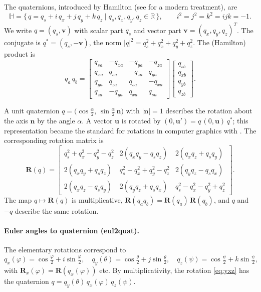 \documentclass{article}
\theoremstyle{plain}
\theoremstyle{definition}
\newcommand{\R}{\mathbb{R}}
\newcommand{\Ha}{\mathbb{H}}
\newcommand{\vect}[1]{\boldsymbol{#1}}
\begin{document}
The quaternions, introduced by Hamilton \cite{hamilton1844} (see \cite{vincequaternions} for a
modern treatment), are
\begin{equation}
  \Ha = \{\, q = q_s + i\,q_x + j\,q_y + k\,q_z \mid q_s, q_x, q_y, q_z \in \R \,\},\qquad
  i^2 = j^2 = k^2 = ijk = -1 .
\end{equation}
We write $q = (q_s, \vect v)$ with scalar part $q_s$ and vector part
$\vect v = (q_x, q_y, q_z)^T$. The conjugate is $q^* = (q_s, -\vect v)$, the norm
$|q|^2 = q_s^2 + q_x^2 + q_y^2 + q_z^2$. The (Hamilton) product is
\begin{equation}
  q_a\, q_b =
  \begin{bmatrix}
    q_{sa} & -q_{xa} & -q_{ya} & -q_{za} \\
    q_{xa} &  q_{sa} & -q_{za} &  q_{ya} \\
    q_{ya} &  q_{za} &  q_{sa} & -q_{xa} \\
    q_{za} & -q_{ya} &  q_{xa} &  q_{sa}
  \end{bmatrix}
  \begin{bmatrix} q_{sb} \\ q_{xb} \\ q_{yb} \\ q_{zb} \end{bmatrix}.
\end{equation}

A unit quaternion $q = \bigl(\cos\tfrac{\alpha}{2},\, \sin\tfrac{\alpha}{2}\,\vect n\bigr)$ with
$|\vect n| = 1$ describes the rotation about the axis $\vect n$ by the angle $\alpha$. A vector
$\vect u$ is rotated by $(0, \vect u') = q\,(0, \vect u)\,q^*$; this representation became the
standard for rotations in computer graphics with \cite{shoemake1985}. The corresponding rotation
matrix is
\begin{equation}\label{eq:Rq}
  \vect R(q) =
  \begin{bmatrix}
    q_s^2 + q_x^2 - q_y^2 - q_z^2 & 2(q_x q_y - q_s q_z) & 2(q_x q_z + q_s q_y) \\
    2(q_x q_y + q_s q_z) & q_s^2 - q_x^2 + q_y^2 - q_z^2 & 2(q_y q_z - q_s q_x) \\
    2(q_x q_z - q_s q_y) & 2(q_y q_z + q_s q_x) & q_s^2 - q_x^2 - q_y^2 + q_z^2
  \end{bmatrix}.
\end{equation}
The map $q \mapsto \vect R(q)$ is multiplicative, $\vect R(q_a q_b) = \vect R(q_a)\,\vect R(q_b)$,
and $q$ and $-q$ describe the same rotation.

\paragraph{Euler angles to quaternion (eul2quat).}
The elementary rotations correspond to
\begin{equation}
  q_x(\varphi) = \cos\tfrac{\varphi}{2} + i \sin\tfrac{\varphi}{2},\quad
  q_y(\theta) = \cos\tfrac{\theta}{2} + j \sin\tfrac{\theta}{2},\quad
  q_z(\psi) = \cos\tfrac{\psi}{2} + k \sin\tfrac{\psi}{2},
\end{equation}
with $\vect R_x(\varphi) = \vect R(q_x(\varphi))$ etc. By multiplicativity, the rotation
\eqref{eq:yxz} has the quaternion $q = q_y(\theta)\, q_x(\varphi)\, q_z(\psi)$.
\end{document}
